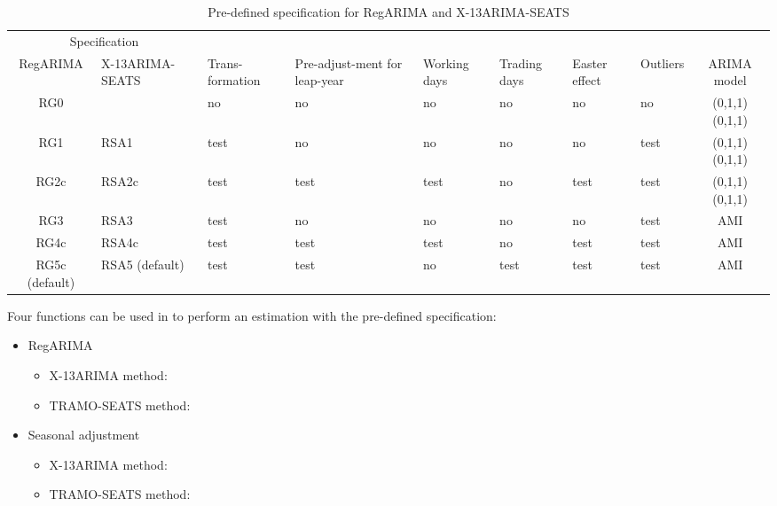 \documentclass[article]{jss}
\providecommand{\tightlist}{%
  \setlength{\itemsep}{0pt}\setlength{\parskip}{0pt}}
\begin{document}
\begin{table}[t]

\caption{\label{tab:pre_def_x13}Pre-defined specification for RegARIMA and X-13ARIMA-SEATS}
\centering
\fontsize{7}{9}\selectfont
\begin{tabular}{c>{\centering\arraybackslash}p{1.7cm}>{\centering\arraybackslash}p{}>{\centering\arraybackslash}p{1.4cm}>{\centering\arraybackslash}p{0.9cm}>{\centering\arraybackslash}p{0.9cm}>{\centering\arraybackslash}p{0.9cm}>{\centering\arraybackslash}p{0.9cm}c}
\toprule
\multicolumn{2}{c}{Specification} & \multicolumn{1}{c}{} \\
\cmidrule(l{3pt}r{3pt}){1-2}
RegARIMA & X-13ARIMA-SEATS & Trans-formation & Pre-adjust-ment for leap-year & Working days & Trading days & Easter effect & Outliers & ARIMA model\\
\midrule
RG0 &  & no & no & no & no & no & no & (0,1,1)(0,1,1)\\
RG1 & RSA1 & test & no & no & no & no & test & (0,1,1)(0,1,1)\\
RG2c & RSA2c & test & test & test & no & test & test & (0,1,1)(0,1,1)\\
RG3 & RSA3 & test & no & no & no & no & test & AMI\\
RG4c & RSA4c & test & test & test & no & test & test & AMI\\
\addlinespace
RG5c (default) & RSA5 (default) & test & test & no & test & test & test & AMI\\
\bottomrule
\end{tabular}
\end{table}

Four functions can be used in  to perform an estimation
with the pre-defined specification:

\begin{itemize}
\tightlist
\item
  RegARIMA

  \begin{itemize}
  \tightlist
  \item
    X-13ARIMA method: 
  \item
    TRAMO-SEATS method: 
  \end{itemize}
\item
  Seasonal adjustment

  \begin{itemize}
  \tightlist
  \item
    X-13ARIMA method: 
  \item
    TRAMO-SEATS method: 
  \end{itemize}
\end{itemize}
\end{document}
